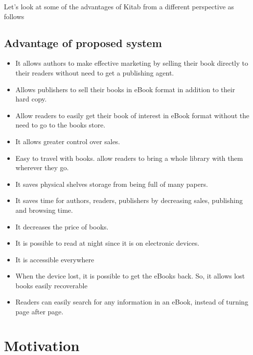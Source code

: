 Let’s look at some of the advantages of Kitab from a different perspective as follows


		\subsection{Advantage of proposed system}

\begin{itemize}
	\item It allows authors to make effective marketing by selling their book directly to their readers without need to get a publishing agent.
	\item Allows publishers to sell their books in eBook format in addition to their hard copy.
	\item Allow readers to easily get their book of interest in eBook format without the need to go to the books store.
	\item It allows greater control over sales.
	\item Easy to travel with books. allow readers to bring a whole library with them wherever they go.
	\item It saves physical shelves storage from being full of many papers.
	\item It saves time for authors, readers, publishers by decreasing sales, publishing and browsing time.
	\item It decreases the price of books.
	\item It is possible to read at night since it is on electronic devices.
	\item It is accessible everywhere 
	\item When the device lost, it is possible to get the eBooks back. So, it allows lost books easily recoverable
	\item Readers can easily search for any information in an eBook, instead of turning page after page.
\end{itemize}

	\section{Motivation}

